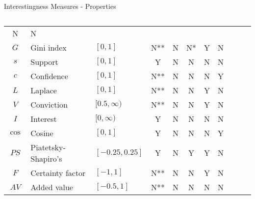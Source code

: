 \begin{frame}{Interestingness Measures - Properties}
\begin{columns}
\begin{column}{0.65\textwidth}
{\begin{tabular}{|c|l|l|c|c|c|c|c|c|c|c|}
					N                     &
					N                                                                                                \\
					$G$                   & Gini index              & $[0,1]$        & N**          & N & N* &
					Y                     &
					N                                                                                                \\
					$s$                   & Support                 & $[0,1]$        & Y            & N & N  &
					N                     &
					N                                                                                                \\
					{\color{red}$c$}      & {\color{red}Confidence} &
					{\color{red}$[0,1]$}  & {\color{red}N**}        & {\color{red}N} &
					{\color{red}N}        & {\color{red}N}          & {\color{red}Y}                                 \\
					$L$                   & Laplace                 & $[0,1]$        & N**          & N & N  &
					Y                     &
					N                                                                                                \\
					$V$                   & Conviction              & $[0.5,\infty)$ & N**          & N & N  &
					Y                     &
					N                                                                                                \\
					$I$                   & Interest                & $[0,\infty)$   & Y            & N & N  &
					N                     &
					N                                                                                                \\
					{\color{red}$\cos$}   & {\color{red}Cosine}     &
					{\color{red}$[0,1]$}  & {\color{red}Y}          & {\color{red}N} &
					{\color{red}N}        & {\color{red}N}          & {\color{red}Y}
					\\
					$PS$                  & Piatetsky-Shapiro's     & $[-0.25,0.25]$ &
					Y                     & N                       & Y              & Y
					                      & N                                                                        \\
					$F$                   & Certainty factor        & $[-1,1]$       & N**          & N & N  & Y & N \\
					$AV$                  & Added value             & $[-0.5,1]$     & N**          & N & N  & N & N \\

\end{tabular}}
\end{column}
\end{columns}
\end{frame}
